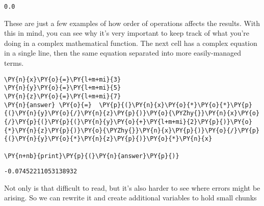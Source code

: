             \begin{tcolorbox}[breakable, size=fbox, boxrule=.5pt, pad at break*=1mm, opacityfill=0]
\begin{Verbatim}[commandchars=\\\{\}]
0.0
\end{Verbatim}
\end{tcolorbox}
        
    These are just a few examples of how order of operations affects the
results. With this in mind, you can see why it's very important to keep
track of what you're doing in a complex mathematical function. The next
cell has a complex equation in a single line, then the same equation
separated into more easily-managed terms.

    \begin{tcolorbox}[breakable, size=fbox, boxrule=1pt, pad at break*=1mm,colback=cellbackground, colframe=cellborder]
\begin{Verbatim}[commandchars=\\\{\}]
\PY{n}{x}\PY{o}{=}\PY{l+m+mi}{3}
\PY{n}{y}\PY{o}{=}\PY{l+m+mi}{5}
\PY{n}{z}\PY{o}{=}\PY{l+m+mi}{7}
\PY{n}{answer} \PY{o}{=}  \PY{p}{(}\PY{n}{x}\PY{o}{*}\PY{o}{*}\PY{p}{(}\PY{n}{y}\PY{o}{/}\PY{n}{z}\PY{p}{)}\PY{o}{\PYZhy{}}\PY{n}{x}\PY{o}{/}\PY{p}{(}\PY{p}{(}\PY{n}{y}\PY{o}{+}\PY{l+m+mi}{2}\PY{p}{)}\PY{o}{*}\PY{n}{z}\PY{p}{)}\PY{o}{\PYZhy{}}\PY{n}{x}\PY{p}{)}\PY{o}{/}\PY{p}{(}\PY{n}{y}\PY{o}{*}\PY{n}{z}\PY{p}{)}\PY{o}{*}\PY{n}{x}

\PY{n+nb}{print}\PY{p}{(}\PY{n}{answer}\PY{p}{)}
\end{Verbatim}
\end{tcolorbox}

    \begin{Verbatim}[commandchars=\\\{\}]
-0.07452211053138932
    \end{Verbatim}

    Not only is that difficult to read, but it's also harder to see where
errors might be arising. So we can rewrite it and create additional
variables to hold small chunks

